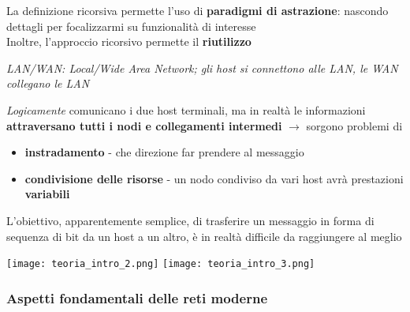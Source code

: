 La definizione ricorsiva permette l'uso di \textbf{paradigmi di astrazione}: nascondo dettagli per focalizzarmi su funzionalit\`a di interesse\\
Inoltre, l'approccio ricorsivo permette il \textbf{riutilizzo}

\begin{example}[frametitle={Esempio: passaggio di informazioni tra host in LAN diverse}]
 \noindent\textit{
    LAN/WAN: Local/Wide Area Network; gli host si connettono alle LAN, le WAN collegano le LAN
  }

  \noindent\begin{minipage}[c]{.6\textwidth}
  \textit{Logicamente} comunicano i due host terminali, ma in realt\`a le informazioni \textbf{attraversano tutti i nodi e collegamenti intermedi} $\rightarrow$ sorgono problemi di
  \begin{itemize}
    \item \textbf{instradamento} - che direzione far prendere al messaggio
    \item \textbf{condivisione delle risorse} - un nodo condiviso da vari host avr\`a prestazioni \textbf{variabili}
  \end{itemize}
  \begin{emphasize}
    L'obiettivo, apparentemente semplice, di trasferire un messaggio in forma di sequenza di bit da un host a un altro, \`e in realt\`a difficile da raggiungere al meglio
  \end{emphasize}
  \end{minipage}\hfill
  \begin{minipage}[c]{.3\textwidth}
  \texttt{[image: teoria\_intro\_2.png]}
  \texttt{[image: teoria\_intro\_3.png]}
  \end{minipage}
  
\end{example}

\vspace{-10pt}
\subsubsection{Aspetti fondamentali delle reti moderne}


